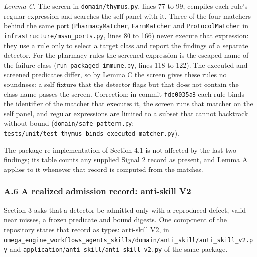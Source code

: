 \documentclass[
  11pt,
]{article}
\newcommand{\passthrough}[1]{#1}
\begin{document}
\emph{Lemma C.} The screen in
\texttt{\nolinkurl{domain/thymus.py}}, lines 77 to 99, compiles
each rule's regular expression and searches the self panel with it.
Three of the four matchers behind the same port
(\passthrough{\lstinline!PharmacyMatcher!},
\passthrough{\lstinline!FarmMatcher!} and
\passthrough{\lstinline!ProtocolMatcher!} in
\texttt{\nolinkurl{infrastructure/mssn_ports.py}}, lines 80 to
166) never execute that expression: they use a rule only to select a
target class and report the findings of a separate detector. For the
pharmacy rules the screened expression is the escaped name of the
failure class (\texttt{\nolinkurl{run_packaged_immune.py}}, lines
118 to 122). The executed and screened predicates differ, so by Lemma C
the screen gives these rules no soundness: a self fixture that the
detector flags but that does not contain the class name passes the
screen. Correction: in commit \passthrough{\lstinline!fdc0035a8!} each
rule binds the identifier of the matcher that executes it, the screen
runs that matcher on the self panel, and regular expressions are limited
to a subset that cannot backtrack without bound
(\texttt{\nolinkurl{domain/safe_pattern.py}};
\texttt{\nolinkurl{tests/unit/test_thymus_binds_executed_matcher.py}}).

The package re-implementation of Section 4.1 is not affected by the last
two findings; its table counts any supplied Signal 2 record as present,
and Lemma A applies to it whenever that record is computed from the
matches.

\hypertarget{a.6-a-realized-admission-record-anti-skill-v2}{%
\subsubsection{A.6 A realized admission record: anti-skill
V2}\label{a.6-a-realized-admission-record-anti-skill-v2}}

Section 3 asks that a detector be admitted only with a reproduced
defect, valid near misses, a frozen predicate and bound digests. One
component of the repository states that record as types: anti-skill V2,
in
\texttt{\nolinkurl{omega_engine_workflows_agents_skills/domain/anti_skill/anti_skill_v2.py}}
and \texttt{\nolinkurl{application/anti_skill/anti_skill_v2.py}}
of the same package.
\end{document}
